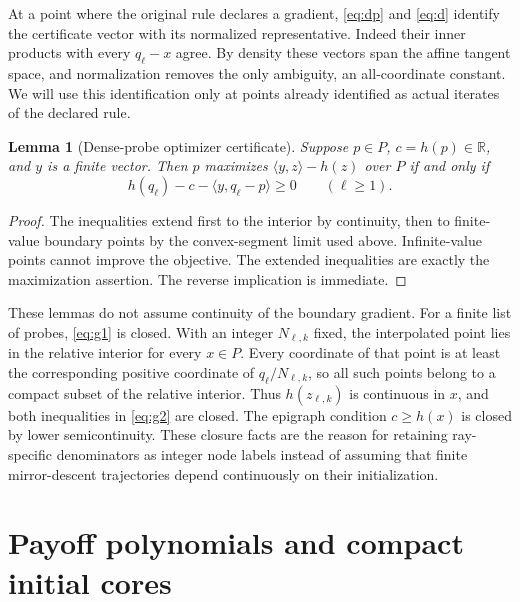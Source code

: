 \documentclass[11pt,a4paper]{article}
\newtheorem{lemma}[theorem]{Lemma}
\newcommand{\R}{\mathbb R}
\begin{document}
At a point where the original rule declares a gradient, \eqref{eq:dp} and \eqref{eq:d} identify
the certificate vector with its normalized representative. Indeed their
inner products with every \(q_\ell-x\) agree. By density these vectors span
the affine tangent space, and normalization removes the only ambiguity,
an all-coordinate constant. We will use this identification only at points
already identified as actual iterates of the declared rule.

\begin{lemma}[Dense-probe optimizer certificate]\label{opt}
Suppose \(p\in P\), \(c=h(p)\in\R\), and \(y\) is a finite vector.
Then \(p\) maximizes \(\langle y,z\rangle-h(z)\) over \(P\)
if and only if
\begin{equation}
h(q_\ell)-c-\langle y,q_\ell-p\rangle\ge0\qquad(\ell\ge1).
\label{eq:o}
\end{equation}
\end{lemma}
\begin{proof}
The inequalities extend first to the interior by continuity, then to finite-value
boundary points by the convex-segment limit used above. Infinite-value points
cannot improve the objective. The extended inequalities are exactly the
maximization assertion. The reverse implication is immediate.
\end{proof}

These lemmas do not assume continuity of the boundary gradient. For a finite
list of probes, \eqref{eq:g1} is closed. With an integer \(N_{\ell,k}\) fixed,
the interpolated point lies in the relative interior for every \(x\in P\).
Every coordinate of that point is at least the corresponding positive
coordinate of \(q_\ell/N_{\ell,k}\), so all such points belong to a compact
subset of the relative interior. Thus \(h(z_{\ell,k})\) is continuous
in \(x\), and both inequalities in \eqref{eq:g2} are closed.
The epigraph condition \(c\ge h(x)\) is closed by lower semicontinuity.
These closure facts are the reason for retaining ray-specific denominators as
integer node labels instead of assuming that finite mirror-descent trajectories
depend continuously on their initialization.

\section{Payoff polynomials and compact initial cores}
\end{document}
